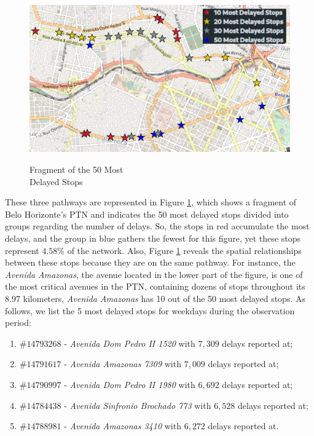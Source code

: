 \begin{figure}[h]
\begin{minipage}[t]{.5\textwidth}
  \label{img:5:mostDelayedStops}
\end{minipage}%
\begin{minipage}[t]{.5\textwidth}
  \centering
  \caption{Fragment of the 50 Most \\Delayed Stops }
  \includegraphics[width=\linewidth]{imagem/cap5/10-50MostDelayedStops.png}
  \label{fig:50mostDelayedStops}
\end{minipage}
\end{figure}

These three pathways are represented in Figure \ref{fig:50mostDelayedStops}, which shows a 
fragment of Belo Horizonte's PTN and indicates the 50 most delayed stops divided into groups
regarding the number of delays. So, the stops in red accumulate the most delays, and
the group in blue gathers the fewest for this figure, yet these stops represent $4.58$\% of the network.
Also, Figure \ref{fig:50mostDelayedStops} reveals the spatial relationships between these stops
because they are on the same pathway. For instance, the \textit{Avenida Amazonas}, the avenue located in the lower part of the figure, is one of the most critical avenues in the PTN, containing dozens of stops throughout its 8.97 kilometers, \textit{Avenida Amazonas} has 10 out of the 50 most delayed
stops. As follows, we list the 5 most delayed stops for weekdays during the observation period:

\begin{enumerate}
    \item $\#14793268$ - \textit{Avenida Dom Pedro II 1520} with $7,309$ delays reported at;
    \item $\#14791617$ - \textit{Avenida Amazonas 7309} with $7,009$ delays reported at;
    \item $\#14790997$ - \textit{Avenida Dom Pedro II 1980} with $6,692$ delays reported at;
    \item $\#14784438$ - \textit{Avenida Sinfronio Brochado 773} with $6,528$ delays reported at;
    \item $\#14788981$ - \textit{Avenida Amazonas 3410} with $6,272$ delays reported at.
\end{enumerate}



